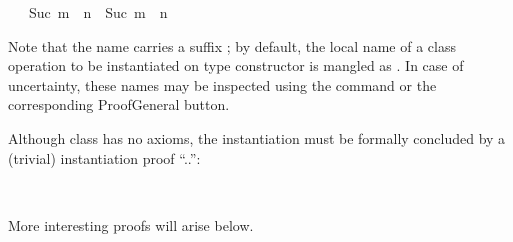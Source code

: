 \begin{isabellebody}
\ \ {\isacharbar}\ {\isachardoublequoteopen}Suc\ m\ {\isasymoplus}\ n\ {\isacharequal}\ Suc\ {\isacharparenleft}m\ {\isasymoplus}\ n{\isacharparenright}{\isachardoublequoteclose}%
\begin{isamarkuptext}%
\noindent Note that the name  carries a
suffix ; by default, the local name of a class operation
 to be instantiated on type constructor \isa{{\isasymkappa}} is mangled
as .  In case of uncertainty, these names may be inspected
using the \hyperlink{command.print-context}{\mbox{}} command or the corresponding
ProofGeneral button.

Although class  has no axioms, the instantiation must be
formally concluded by a (trivial) instantiation proof ``..'':%
\end{isamarkuptext}%
\isamarkuptrue%
\isamarkupfalse%
%
\isadelimproof
\ %
\endisadelimproof
%
\isatagproof
\isacommand{{\isachardot}{\isachardot}}\isamarkupfalse%
%
\endisatagproof
{\isafoldproof}%
%
\isadelimproof
%
\endisadelimproof
%
\begin{isamarkuptext}%
\noindent More interesting  proofs will
arise below.


\end{isamarkuptext}
\end{isabellebody}
